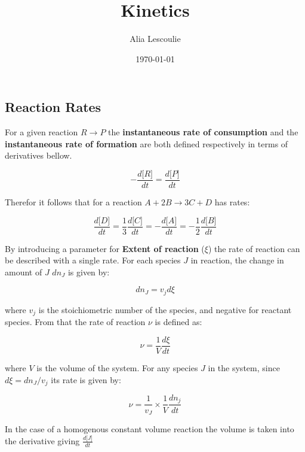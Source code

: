 \documentclass[a4paper, 12 pt]{article}
\author{Alia Lescoulie}
\title{\vspace{-1.5cm}Kinetics}
\date{\today}
\newcommand{\conc}[1]{\lbrack #1 \rbrack}
\newcommand{\deriv}[2]{\frac{d #1}{d #2}}
\begin{document}
\maketitle
\begin{flushleft}
\section*{Reaction Rates}

For a given reaction $R \rightarrow P$ the \textbf{instantaneous rate of consumption} and the  \textbf{instantaneous rate of formation} are both defined respectively in terms of derivatives bellow.

\begin{equation*}
    -\deriv{\conc{R}}{t} = \deriv{\conc{P}}{t} 
\end{equation*}

Therefor it follows that for a reaction $ A + 2B \rightarrow 3C + D$ has rates:

\begin{equation*}
    \deriv{\conc{D}}{t} = \frac{1}{3} \deriv{\conc{C}}{t} = -\deriv{\conc{A}}{t} = - \frac{1}{2} \deriv{\conc{B}}{t}
\end{equation*}

By introducing a parameter for \textbf{Extent of reaction} ($\xi$) the rate of reaction can be described with a single rate. For each species $J$ in reaction, the change in amount of $J$ $dn_J$ is given by:

\begin{equation*}
    dn_J = v_j d\xi
\end{equation*}

where $v_j$ is the stoichiometric number of the species, and negative for reactant species. From that the rate of reaction $\nu$ is defined as:

\begin{equation*}
    \nu = \frac{1}{V} \deriv{\xi}{t}
\end{equation*}

where $V$ is the volume of the system. For any species $J$ in the system, since $d\xi = dn_J/v_j$ its rate is given by:

\begin{equation*}
    \nu = \frac{1}{v_J} \times \frac{1}{V} \deriv{n_j}{t}
\end{equation*}

In the case of a homogenous constant volume reaction the volume is taken into the derivative giving $\deriv{\conc{J}}{t}$


\end{flushleft}
\end{document}
